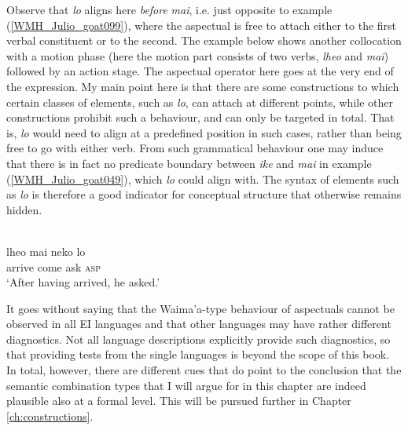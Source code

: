 Observe that \textit{lo} aligns here \emph{before} \textit{mai}, i.e. just opposite to example (\ref{WMH_Julio_goat099}), where the aspectual is free to attach either to the first verbal constituent or to the second. The example below shows another collocation with a motion phase (here the motion part consists of two verbs, \textit{lheo} and \textit{mai}) followed by an action stage. The aspectual operator here goes at the very end of the expression. My main point here is that there are some constructions to which certain classes of elements, such as \textit{lo}, can attach at different points, while other constructions prohibit such a behaviour, and can only be targeted in total. That is, \textit{lo} would need to align at a predefined position in such cases, rather than being free to go with either verb. From such grammatical behaviour one may induce that there is in fact no predicate boundary between \textit{ike} and \textit{mai} in example (\ref{WMH_Julio_goat049}), which \textit{lo} could align with. The syntax of elements such as \textit{lo} is therefore a good indicator for conceptual structure that otherwise remains hidden.

\ea \label{WMH_Julio_goat067} 
\\
\gll lheo mai neko lo \\
 arrive come ask \textsc{asp} \\
\glft `After having arrived, he asked.'\\
\z

It goes without saying that the Waima'a-type behaviour of aspectuals cannot be observed in all EI languages and that other languages may have rather different diagnostics. Not all language descriptions explicitly provide such diagnostics, so that providing tests from the single languages is beyond the scope of this book. In total, however, there are different cues that do point to the conclusion that the semantic combination types that I will argue for in this chapter are indeed plausible also at a formal level. This will be pursued further in Chapter \ref{ch:constructions}.

